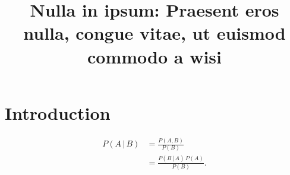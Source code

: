 \documentclass[nonacm,anonymous,acmsmall,pdftex]{acmart}
\begin{document}
\title{Nulla in ipsum: Praesent eros nulla, congue vitae, ut euismod commodo a wisi}
\begin{abstract}
\lipsum[1]
\end{abstract}
\maketitle

\section{Introduction}

\lipsum[1-2]
\begin{align} 
P(A \,|\, B) & = \frac{P(A, B)}{P(B)} \\
    & = \frac{P(B \,|\, A)\, P(A)}{P(B)}.
\end{align}
\lipsum[3-20]
\end{document}
